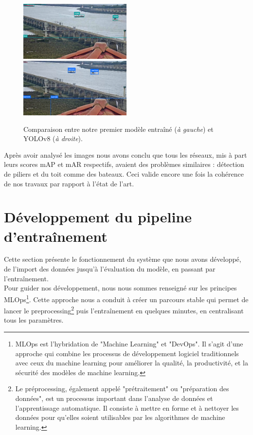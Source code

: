 \begin{figure}[H]
    \includegraphics[width=0.5\textwidth]{./img/first_inference2.png}
    \includegraphics[width=0.5\textwidth]{./img/yolov8_inference.png}
    \caption{Comparaison entre notre premier modèle entraîné (\textit{à gauche}) et YOLOv8 (\textit{à droite}).}
\end{figure}

Après avoir analysé les images nous avons conclu que tous les réseaux, mis à part leurs scores mAP et mAR
respectifs, avaient des problèmes similaires : détection de piliers et du toit comme des bateaux.
Ceci valide encore une fois la cohérence de nos travaux par rapport à l'état de l'art.

\section{Développement du pipeline d'entraînement}

Cette section présente le fonctionnement du système que nous avons développé, de l'import des données
jusqu'à l'évaluation du modèle, en passant par l'entraînement. \\

Pour guider nos développement, nous
nous sommes renseigné sur les principes MLOps\footnote{MLOps est l'hybridation de "Machine Learning" et "DevOps".
Il s'agit d'une approche qui combine les processus de développement logiciel traditionnels avec ceux
du machine learning pour améliorer la qualité, la productivité, et la sécurité des modèles de machine learning.}.
Cette approche nous a conduit à créer un parcours stable qui permet de lancer le preprocessing\footnote{
Le préprocessing, également appelé "prétraitement" ou "préparation des données",
est un processus important dans l'analyse de données et l'apprentissage automatique.
Il consiste à mettre en forme et à nettoyer les données pour qu'elles soient utilisables
par les algorithmes de machine learning.} puis l'entraînement en quelques minutes, en
centralisant tous les paramètres.\\

